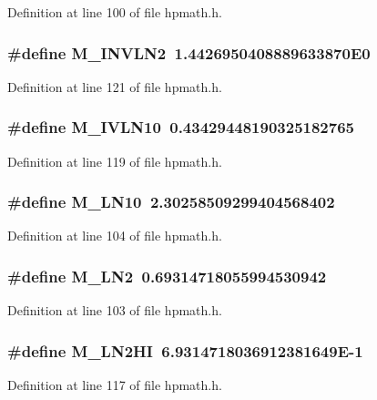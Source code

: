 Definition at line 100 of file hpmath.h.
\subsubsection{\setlength{\rightskip}{0pt plus 5cm}\#define M\_\-INVLN2\ 1.4426950408889633870E0}\label{hpmath_8h_a31}




Definition at line 121 of file hpmath.h.
\subsubsection{\setlength{\rightskip}{0pt plus 5cm}\#define M\_\-IVLN10\ 0.43429448190325182765}\label{hpmath_8h_a29}




Definition at line 119 of file hpmath.h.
\subsubsection{\setlength{\rightskip}{0pt plus 5cm}\#define M\_\-LN10\ 2.30258509299404568402}\label{hpmath_8h_a14}




Definition at line 104 of file hpmath.h.
\subsubsection{\setlength{\rightskip}{0pt plus 5cm}\#define M\_\-LN2\ 0.69314718055994530942}\label{hpmath_8h_a13}




Definition at line 103 of file hpmath.h.
\subsubsection{\setlength{\rightskip}{0pt plus 5cm}\#define M\_\-LN2HI\ 6.9314718036912381649E-1}\label{hpmath_8h_a27}




Definition at line 117 of file hpmath.h.
